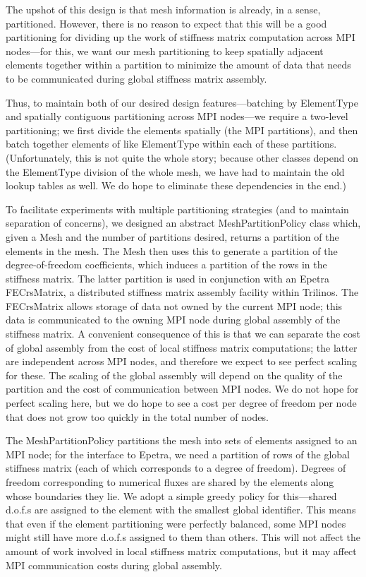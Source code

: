\documentclass{article}
\begin{document}
The upshot of this design is that mesh information is already, in a sense, partitioned.  However, there is no reason to expect that this will be a good partitioning for dividing up the work of stiffness matrix computation across MPI nodes---for this, we want our mesh partitioning to keep spatially adjacent elements together within a partition to minimize the amount of data that needs to be communicated during global stiffness matrix assembly.

Thus, to maintain both of our desired design features---batching by ElementType and spatially contiguous partitioning across MPI nodes---we require a two-level partitioning; we first divide the elements spatially (the MPI partitions), and then batch together elements of like ElementType within each of these partitions.  (Unfortunately, this is not quite the whole story; because other classes depend on the ElementType division of the whole mesh, we have had to maintain the old lookup tables as well.  We do hope to eliminate these dependencies in the end.)

To facilitate experiments with multiple partitioning strategies (and to maintain separation of concerns), we designed an abstract MeshPartitionPolicy class which, given a Mesh and the number of partitions desired, returns a partition of the elements in the mesh.  The Mesh then uses this to generate a partition of the degree-of-freedom coefficients, which induces a partition of the rows in the stiffness matrix.  The latter partition is used in conjunction with an Epetra FECrsMatrix, a distributed stiffness matrix assembly facility within Trilinos.  The FECrsMatrix allows storage of data not owned by the current MPI node; this data is communicated to the owning MPI node during global assembly of the stiffness matrix.  A convenient consequence of this is that we can separate the cost of global assembly from the cost of local stiffness matrix computations; the latter are independent across MPI nodes, and therefore we expect to see perfect scaling for these.  The scaling of the global assembly will depend on the quality of the partition and the cost of communication between MPI nodes.  We do not hope for perfect scaling here, but we do hope to see a cost per degree of freedom per node that does not grow too quickly in the total number of nodes.

The MeshPartitionPolicy partitions the mesh into sets of elements assigned to an MPI node; for the interface to Epetra, we need a partition of rows of the global stiffness matrix (each of which corresponds to a degree of freedom).  Degrees of freedom corresponding to numerical fluxes are shared by the elements along whose boundaries they lie.  We adopt a simple greedy policy for this---shared d.o.f.s are assigned to the element with the smallest global identifier.  This means that even if the element partitioning were perfectly balanced, some MPI nodes might still have more d.o.f.s assigned to them than others.  This will not affect the amount of work involved in local stiffness matrix computations, but it may affect MPI communication costs during global assembly.
\end{document}
